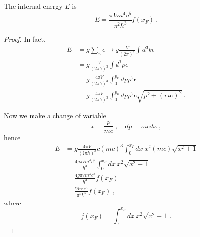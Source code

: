    The internal energy $E$ is 
    \begin{equation*}
        E = \frac{\pi V m^4 c^5}{\pi^2 \hbar^3} f(x_F) ~.
    \end{equation*}
    \begin{proof}
        In fact,
        \begin{equation*}
        \begin{aligned}
            E & = g \sum_{n} \epsilon \rightarrow g \frac{V}{(2\pi)^3} \int d^3 k \epsilon \\ & = g \frac{V}{(2\pi \hbar)^3} \int d^3 p \epsilon \\ & = g \frac{4 \pi V}{(2\pi \hbar)^3} \int_0^{p_F} dp p^2 \epsilon \\ & = g \frac{4 \pi V}{(2\pi \hbar)^3} \int_0^{p_F} dp p^2 c \sqrt{p^2 + (mc)^2} ~.
        \end{aligned}
        \end{equation*}

        Now we make a change of variable 
        \begin{equation*}
            x = \frac{p}{mc} ~, \quad dp = mc dx ~,
        \end{equation*}
        hence 
        \begin{equation*}
        \begin{aligned}
            E & = g \frac{4 \pi V}{(2\pi \hbar)^3} c (mc)^3 \int_0^{x_F} dx ~ x^2 (mc)\sqrt{x^2 + 1} \\ & =  \frac{4 g \pi V m^4 c^5}{h^3} \int_0^{x_F} dx ~ x^2\sqrt{x^2 + 1} \\ & = \frac{4 g \pi V m^4 c^5}{h^3} f(x_F) \\ & = \frac{V m^4 c^5}{\pi^2 \hbar^3} f(x_F) ~,
        \end{aligned}
        \end{equation*}
        where 
        \begin{equation*}
            f(x_F) = \int_0^{x_F} dx ~ x^2 \sqrt{x^2 + 1} ~.
        \end{equation*}
    \end{proof}

